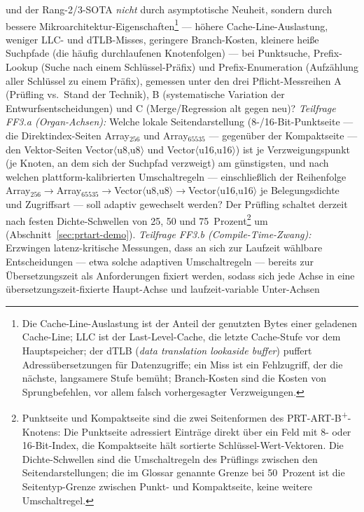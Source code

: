 \begin{description}
  und der Rang-2/3-SOTA \emph{nicht} durch asymptotische Neuheit, sondern durch bessere
  Mikroarchitektur-Eigenschaften\footnote{Die Cache-Line-Auslastung ist der Anteil der genutzten
  Bytes einer geladenen Cache-Line; LLC ist der Last-Level-Cache, die letzte Cache-Stufe vor dem
  Hauptspeicher; der dTLB (\emph{data translation lookaside buffer}) puffert Adressübersetzungen für
  Datenzugriffe; ein Miss ist ein Fehlzugriff, der die nächste, langsamere Stufe bemüht; Branch-Kosten
  sind die Kosten von Sprungbefehlen, vor allem falsch vorhergesagter Verzweigungen.} --- höhere
  Cache-Line-Auslastung, weniger LLC- und dTLB-Misses, geringere Branch-Kosten, kleinere heiße
  Suchpfade (die häufig durchlaufenen Knotenfolgen) --- bei Punktsuche, Prefix-Lookup (Suche nach
  einem Schlüssel-Präfix) und Prefix-Enumeration (Aufzählung aller Schlüssel zu einem Präfix),
  gemessen unter den drei Pflicht-Messreihen A (Prüfling vs.\ Stand der
  Technik), B (systematische Variation der Entwurfsentscheidungen) und C (Merge/Regression alt gegen
  neu)? \emph{Teilfrage FF3.a (Organ-Achsen):} Welche lokale Seitendarstellung (8-/16-Bit-Punktseite ---
  die Direktindex-Seiten Array$_{256}$ und Array$_{65535}$ --- gegenüber der Kompaktseite --- den
  Vektor-Seiten Vector$\langle$u8,u8$\rangle$ und Vector$\langle$u16,u16$\rangle$) ist je
  Verzweigungspunkt (je Knoten, an dem sich der Suchpfad verzweigt) am günstigsten, und nach welchen
  plattform-kalibrierten
  Umschaltregeln --- einschließlich der Reihenfolge
  Array$_{256}\to$Array$_{65535}\to$Vector$\langle$u8,u8$\rangle\to$Vector$\langle$u16,u16$\rangle$
  je Belegungsdichte und Zugriffsart --- soll adaptiv gewechselt werden? Der Prüfling schaltet derzeit nach festen
  Dichte-Schwellen von 25, 50 und 75~Prozent\footnote{Punktseite und Kompaktseite sind die zwei
  Seitenformen des PRT-ART-B\textsuperscript{+}-Knotens: Die Punktseite adressiert Einträge direkt über ein Feld mit 8-
  oder 16-Bit-Index, die Kompaktseite hält sortierte Schlüssel-Wert-Vektoren. Die Dichte-Schwellen
  sind die Umschaltregeln des Prüflings zwischen den Seitendarstellungen; die im Glossar genannte
  Grenze bei 50~Prozent ist die Seitentyp-Grenze zwischen Punkt- und Kompaktseite, keine weitere
  Umschaltregel.} um (Abschnitt~\ref{sec:prtart-demo}).
  \emph{Teilfrage FF3.b (Compile-Time-Zwang):} Erzwingen latenz-kritische Messungen, dass an sich zur
  Laufzeit wählbare Entscheidungen --- etwa solche adaptiven Umschaltregeln --- bereits zur
  Übersetzungszeit als Anforderungen fixiert werden, sodass sich jede Achse in eine
  übersetzungszeit-fixierte Haupt-Achse und laufzeit-variable Unter-Achsen

\end{description}

